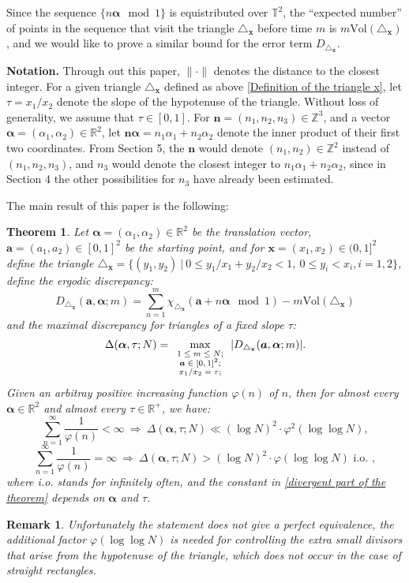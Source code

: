 \documentclass[11pt]{article}
\newtheorem{thm}{Theorem}[section]
\newtheorem*{remark}{Remark}
\newcommand{\beq}{\begin{equation}}
\newcommand{\eeq}{\end{equation}}
\newcommand{\fc}{\frac}
\newcommand{\nid}{\noindent}
\newcommand{\Z}{\mathbb{Z}}
\newcommand{\T}{\mathbb{T}}
\newcommand{\R}{\mathbb{R}}
\renewcommand{\a}{\alpha}
\renewcommand{\(}{\left(}
\renewcommand{\)}{\right)}
\renewcommand{\bf}{\mathbf}
\newcommand{\tria}{\triangle_{\bf{x}}}
\newcommand{\n}{\bf{n}}
\newcommand{\bma}{\bm{\alpha}}
\newcommand{\<}{\langle}
\renewcommand{\>}{\rangle}
\begin{document}
Since the sequence $\{n\bm{\a} \mod 1\}$ is equistributed over $\T^2$, the ``expected number'' of points in the sequence that visit the triangle $\tria$ before time $m$ is $m\text{Vol}(\tria)$, and we would like to prove a similar bound for the error term $D_{\tria}$.

\nid\textbf{Notation.} Through out this paper,  $\| \cdot\|$ denotes the distance to the closest integer. For a given triangle $\tria$ defined as above \eqref{Definition of the triangle x}, let $\tau=x_1/x_2$ denote the slope of the hypotenuse of the triangle. Without loss of generality, we assume that $\tau\in[0,1]$. For $\n=(n_1,n_2,n_3)\in \Z^3$, and a vector $\bma=(\a_1,\a_2)\in \R^2$, let $\n\bma=n_1\a_1+n_2\a_2$ denote the inner product of their first two coordinates. From Section 5, the $\n$ would denote $(n_1, n_2)\in \Z^2$ instead of $(n_1,n_2,n_3)$, and $n_3$ would denote the closest integer to $n_1\a_1+n_2\a_2$, since in Section 4 the other possibilities for $n_3$ have already been estimated.

The main result of this paper is the following:
\begin{thm}{\label{main result}}
Let $\bm{\a}=(\a_1, \a_2)\in \R^2$ be the translation vector, $\bm{a}=(a_1,a_2)\in [0,1]^2$ be the starting point, and for $\bf{x}=(x_1, x_2)\in (0,1]^2$ define the triangle $\triangle_{\bf{x}}=\{(y_1,y_2)\ | \ 0\le y_1/x_1+y_2/x_2 <1, \ 0\le y_i< x_i, i=1,2\}$, define the ergodic discrepancy:
$$D_{\triangle_{\bf{x}}} (\bm{a},\bm{\a}; m) = \sum\limits_{n=1}^{m}  \chi_{\triangle_{\bf{x}}}(\bm{a}+n\bm{\alpha} \mod 1)- m\text{Vol}(\triangle_{\bf{x}})$$
and the maximal discrepancy for triangles of a fixed slope $\tau$:
$$
\Delta(\bm{\a},\tau; N)= \max_{\mbox{\scriptsize$\begin{array}{c}
1\le m \le N; \\
\bm{a}\in [0,1]^2;\\
x_1/x_2=\tau;
\end{array}$}} |D_{\tria} (\bm{a},\bm{\a}; m)|.
$$
Given an arbitray positive increasing function $\varphi(n)$ of $n$, then for almost every $\bm{\a}\in \R^2$ and almost every $\tau\in \R^+$, we have: 
\beq\label{divergent part of the theorem}
\sum_{n=1}^\infty \fc{1}{\varphi(n)}<\infty \ \Rightarrow \ \Delta(\bm{\a},\tau; N)\ll (\log N)^2\cdot \varphi^2(\log \log N),
\eeq
\beq\label{convergent part of the theorem}
\sum_{n=1}^\infty \fc{1}{\varphi(n)}=\infty \ \Rightarrow \ \Delta(\bm{\a},\tau; N) > (\log N)^2\cdot \varphi(\log \log N) \text{ i.o. },
\eeq
where i.o. stands for infinitely often, and the constant in \eqref{divergent part of the theorem} depends on $\bma$ and $\tau$.

\end{thm}
\begin{remark}
Unfortunately the statement does not give a perfect equivalence, the additional factor $\varphi(\log \log N)$ is needed for controlling the extra small divisors that arise from the hypotenuse of the triangle, which does not occur in the case of straight rectangles.
\end{remark}
\end{document}
